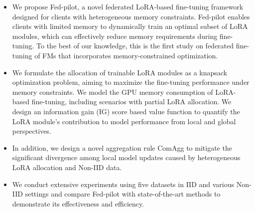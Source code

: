 \documentclass[sigconf]{acmart}
\begin{document}
\begin{itemize}
    \item We propose Fed-pilot, a novel federated LoRA-based fine-tuning framework designed for clients with heterogeneous memory constraints. Fed-pilot enables clients with limited memory to dynamically train an optimal subset of LoRA modules, which can effectively reduce memory requirements during fine-tuning. 
    To the best of our knowledge, this is the first study on federated fine-tuning of FMs that incorporates memory-constrained optimization. %
    \item We formulate the allocation of trainable LoRA modules as a knapsack optimization problem, aiming to maximize the fine-tuning performance under memory constraints. We model the GPU memory consumption of LoRA-based fine-tuning, including scenarios with partial LoRA allocation. We design an information gain (IG) score based value function to quantify the LoRA module's contribution to model performance from local and global perspectives. 
    
    \item In addition, we design a novel aggregation rule ComAgg to mitigate the significant divergence among local model updates caused by heterogeneous LoRA allocation and Non-IID data.
    \item We conduct extensive experiments using five datasets in IID and various Non-IID settings and compare Fed-pilot with state-of-the-art methods to demonstrate its effectiveness and efficiency.
\end{itemize}

\end{document}
